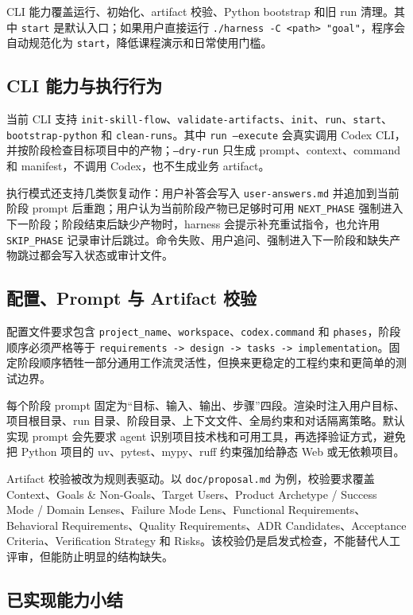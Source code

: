 \documentclass[11pt,a4paper]{article}
\newcommand{\code}[1]{\texttt{\small #1}}
\begin{document}
CLI 能力覆盖运行、初始化、artifact 校验、Python bootstrap 和旧 run 清理。其中 \code{start} 是默认入口；如果用户直接运行 \code{./harness -C <path> "goal"}，程序会自动规范化为 \code{start}，降低课程演示和日常使用门槛。

\subsection{CLI 能力与执行行为}

当前 CLI 支持 \code{init-skill-flow}、\code{validate-artifacts}、\code{init}、\code{run}、\code{start}、\code{bootstrap-python} 和 \code{clean-runs}。其中 \code{run --execute} 会真实调用 Codex CLI，并按阶段检查目标项目中的产物；\code{--dry-run} 只生成 prompt、context、command 和 manifest，不调用 Codex，也不生成业务 artifact。

执行模式还支持几类恢复动作：用户补答会写入 \code{user-answers.md} 并追加到当前阶段 prompt 后重跑；用户认为当前阶段产物已足够时可用 \code{NEXT\_PHASE} 强制进入下一阶段；阶段结束后缺少产物时，harness 会提示补充重试指令，也允许用 \code{SKIP\_PHASE} 记录审计后跳过。命令失败、用户追问、强制进入下一阶段和缺失产物跳过都会写入状态或审计文件。

\subsection{配置、Prompt 与 Artifact 校验}

配置文件要求包含 \code{project\_name}、\code{workspace}、\code{codex.command} 和 \code{phases}，阶段顺序必须严格等于 \code{requirements -> design -> tasks -> implementation}。固定阶段顺序牺牲一部分通用工作流灵活性，但换来更稳定的工程约束和更简单的测试边界。

每个阶段 prompt 固定为“目标、输入、输出、步骤”四段。渲染时注入用户目标、项目根目录、run 目录、阶段目录、上下文文件、全局约束和对话隔离策略。默认实现 prompt 会先要求 agent 识别项目技术栈和可用工具，再选择验证方式，避免把 Python 项目的 uv、pytest、mypy、ruff 约束强加给静态 Web 或无依赖项目。

Artifact 校验被改为规则表驱动。以 \code{doc/proposal.md} 为例，校验要求覆盖 Context、Goals \& Non-Goals、Target Users、Product Archetype / Success Mode / Domain Lenses、Failure Mode Lens、Functional Requirements、Behavioral Requirements、Quality Requirements、ADR Candidates、Acceptance Criteria、Verification Strategy 和 Risks。该校验仍是启发式检查，不能替代人工评审，但能防止明显的结构缺失。

\subsection{已实现能力小结}
\end{document}
